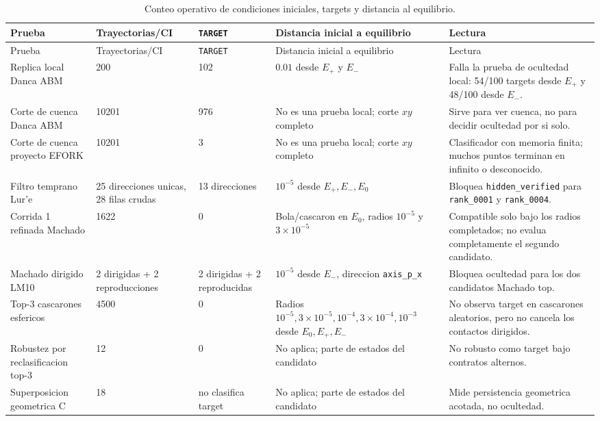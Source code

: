 \documentclass[11pt]{article}
\newcommand{\status}[1]{\texttt{\small #1}}
\newcommand{\target}{\texttt{TARGET}}
\newcommand{\hiddenverified}{\texttt{hidden\_verified}}
\newcommand{\Ezero}{E_0}
\newcommand{\Eplus}{E_+}
\newcommand{\Eminus}{E_-}
\begin{document}
\begin{longtable}{@{}L{0.25\textwidth}L{0.13\textwidth}L{0.11\textwidth}L{0.22\textwidth}L{0.23\textwidth}@{}}
\caption{Conteo operativo de condiciones iniciales, targets y distancia al equilibrio.}\\
\toprule
Prueba & Trayectorias/CI & \target{} & Distancia inicial a equilibrio & Lectura \\
\midrule
\endfirsthead
\toprule
Prueba & Trayectorias/CI & \target{} & Distancia inicial a equilibrio & Lectura \\
\midrule
\endhead
Replica local Danca ABM &
200 & 102 &
\(0.01\) desde \(\Eplus\) y \(\Eminus\) &
Falla la prueba de ocultedad local: 54/100 targets desde \(\Eplus\) y 48/100
desde \(\Eminus\). \\
Corte de cuenca Danca ABM &
10201 & 976 &
No es una prueba local; corte \(xy\) completo &
Sirve para ver cuenca, no para decidir ocultedad por si solo. \\
Corte de cuenca proyecto EFORK &
10201 & 3 &
No es una prueba local; corte \(xy\) completo &
Clasificador con memoria finita; muchos puntos terminan en infinito o
desconocido. \\
Filtro temprano Lur'e &
25 direcciones unicas, 28 filas crudas & 13 direcciones &
\(10^{-5}\) desde \(\Eplus,\Eminus,\Ezero\) &
Bloquea \hiddenverified{} para \status{rank\_0001} y \status{rank\_0004}. \\
Corrida 1 refinada Machado &
1622 & 0 &
Bola/cascaron en \(\Ezero\), radios \(10^{-5}\) y \(3\times10^{-5}\) &
Compatible solo bajo los radios completados; no evalua completamente el segundo
candidato. \\
Machado dirigido LM10 &
2 dirigidas + 2 reproducciones & 2 dirigidas + 2 reproducidas &
\(10^{-5}\) desde \(\Eminus\), direccion \status{axis\_p\_x} &
Bloquea ocultedad para los dos candidatos Machado top. \\
Top-3 cascarones esfericos &
4500 & 0 &
Radios \(10^{-5},3\times10^{-5},10^{-4},3\times10^{-4},10^{-3}\) desde
\(\Ezero,\Eplus,\Eminus\) &
No observa target en cascarones aleatorios, pero no cancela los contactos
dirigidos. \\
Robustez por reclasificacion top-3 &
12 & 0 &
No aplica; parte de estados del candidato &
No robusto como target bajo contratos alternos. \\
Superposicion geometrica C &
18 & no clasifica target &
No aplica; parte de estados del candidato &
Mide persistencia geometrica acotada, no ocultedad. \\
\bottomrule
\end{longtable}
\end{document}
